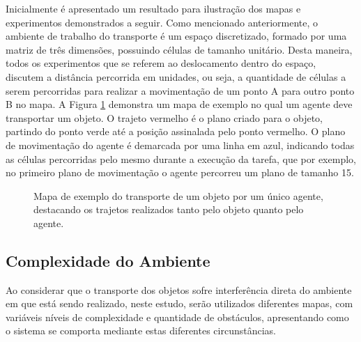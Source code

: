 Inicialmente é apresentado um resultado para ilustração dos mapas e experimentos demonstrados a seguir.
Como mencionado anteriormente, o ambiente de trabalho do transporte é um espaço discretizado, formado por uma matriz de três dimensões, possuindo células de tamanho unitário.
Desta maneira, todos os experimentos que se referem ao deslocamento dentro do espaço, discutem a distância percorrida em unidades, ou seja, a quantidade de células a serem percorridas para realizar a movimentação de um ponto A para outro ponto B no mapa.
A Figura \ref{fig:result} demonstra um mapa de exemplo no qual um agente deve transportar um objeto. O trajeto vermelho é o plano criado para o objeto, partindo do ponto verde até a posição assinalada pelo ponto vermelho. O plano de movimentação do agente é demarcada por uma linha em azul, indicando todas as células percorridas pelo mesmo durante a execução da tarefa, que por exemplo, no primeiro plano de movimentação o agente percorreu um plano de tamanho 15.

\begin{figure}[htpb]
  \centering
  \setlength{\fboxsep}{0pt}
  \caption[Mapa de exemplo do transporte de um objeto por um único agente]{Mapa de exemplo do transporte de um objeto por um único agente, destacando os trajetos realizados tanto pelo objeto quanto pelo agente.}
  \label{fig:result}
\end{figure}

\subsection{Complexidade do Ambiente} %
\label{sub:complexidade_do_ambiente}

Ao considerar que o transporte dos objetos sofre interferência direta do ambiente em que está sendo realizado, neste estudo, serão utilizados diferentes mapas, com variáveis níveis de complexidade e quantidade de obstáculos, apresentando como o sistema se comporta mediante estas diferentes circunstâncias.


